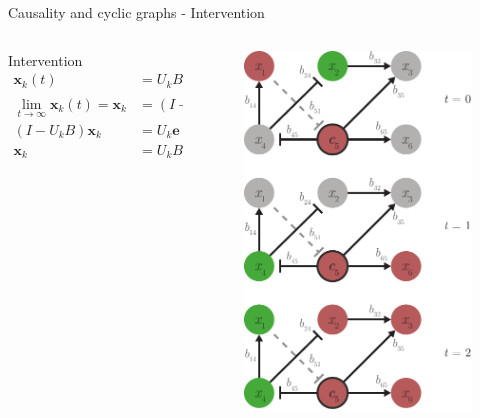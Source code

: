 \begin{frame}{Causality and cyclic graphs - Intervention}
\begin{columns}
\begin{column}{0.65\textwidth}
Intervention
\begin{subequations}
\label{eq:eber_intervention}
\begin{align}
\boldsymbol{x}_k(t) &=
    U_k B \boldsymbol{x}_k(t-1) + U_k \boldsymbol{e} + \boldsymbol{c}_k
\\
\lim_{t \rightarrow \infty} \boldsymbol{x}_k(t) = \boldsymbol{x}_k &=
    (I - U_k B)^{-1} (U_k \boldsymbol{e} + \boldsymbol{c}_k)
\\
(I - U_k B) \boldsymbol{x}_k &=
    U_k \boldsymbol{e} + \boldsymbol{c}_k
\\
\label{eq:eber_intervention.d}
\boldsymbol{x}_k &=
    U_k B \boldsymbol{x}_k + U_k \boldsymbol{e} + \boldsymbol{c}_k
\end{align}
\end{subequations}
\end{column}
\begin{column}{0.35\textwidth}
\begin{figure}
    \centering
    \includegraphics[width=.8\textwidth]{theory/fig/eberhardt_intervention.pdf}

\end{figure}
\end{column}
\end{columns}
\end{frame}
